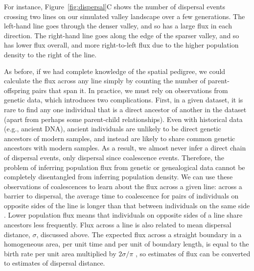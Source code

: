 \documentclass{ar-1col}
\begin{document}
For instance, Figure~\ref{fig:dispersal}C
shows the number of dispersal events crossing two lines on our simulated valley landscape
over a few generations.
The left-hand line goes through the denser valley, 
and so has a large flux in each direction.
The right-hand line goes along the edge of the sparser valley,
and so has lower flux overall, and more right-to-left flux
due to the higher population density to the right of the line.

As before, if we had complete knowledge of the spatial pedigree,
we could calculate the flux across any line simply by counting the number of
parent-offspring pairs that span it.
In practice, we must rely on observations from genetic data,
which introduces two complications.
First, in a given dataset, it is rare to find any one individual
that is a direct ancestor of another in the dataset
(apart from perhaps some parent-child relationships).
Even with historical data (e.g., ancient DNA),
ancient individuals are unlikely to be direct genetic ancestors of modern samples,
and instead are likely to share common genetic ancestors with modern samples.
As a result, we almost never infer a direct chain of dispersal events,
only dispersal since coalescence events.
Therefore, the problem of inferring population flux from genetic or genealogical data
cannot be completely disentangled from inferring population density.
We can use these observations of coalescences to learn about the flux across a given line:
across a barrier to dispersal,
the average time to coalescence for pairs of individuals on opposite sides of the line
is longer than that between individuals on the same side \citep{bedassle}.
Lower population flux means that individuals on opposite sides of a line share ancestors
less frequently.
Flux across a line is also related to mean dispersal distance, $\sigma$, discussed above.
The expected flux across a straight boundary in a homogeneous area,
per unit time and per unit of boundary length,
is equal to the birth rate per unit area multiplied by $2 \sigma / \pi$
\citep{buffon1777},
so estimates of flux can be converted to estimates of dispersal distance.



\end{document}
